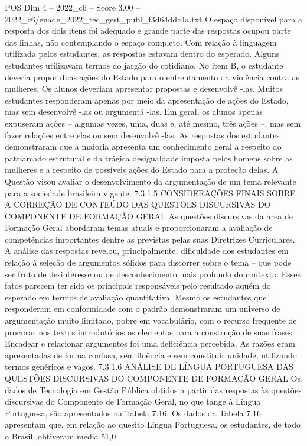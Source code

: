 \begin{textsample}{POS Dim 4 – 2022\_c6 – Score 3.00 – 2022\_c6/enade\_2022\_tec\_gest\_publ\_f3d64ddc4a.txt}
O espaço disponível para a resposta dos dois itens foi adequado e grande parte das respostas ocupou parte das linhas, não contemplando o espaço completo.
Com relação à linguagem utilizada pelos estudantes, as respostas estavam dentro do esperado.
Alguns estudantes utilizavam termos do jargão do cotidiano.
No item B, o estudante deveria propor duas ações do Estado para o enfrentamento da violência contra as mulheres.
Os alunos deveriam apresentar propostas e desenvolvê -las.
Muitos estudantes responderam apenas por meio da apresentação de ações do Estado, mas sem desenvolvê -las ou argumentá -las.
Em geral, os alunos apenas expuseram ações – algumas vezes, uma, duas e, até mesmo, três ações –, mas sem fazer relações entre elas ou sem desenvolvê -las.
As respostas dos estudantes demonstraram que a maioria apresenta um conhecimento geral a respeito do patriarcado estrutural e da trágica desigualdade imposta pelos homens sobre as mulheres e a respeito de possíveis ações do Estado para a proteção delas.
A Questão visou avaliar o desenvolvimento da argumentação de um tema relevante para a sociedade brasileira vigente. 7.3.1.5 CONSIDERAÇÕES FINAIS SOBRE A CORREÇÃO DE CONTEÚDO DAS QUESTÕES DISCURSIVAS DO COMPONENTE DE FORMAÇÃO GERAL As questões discursivas da área de Formação Geral abordaram temas atuais e proporcionaram a avaliação de competências importantes dentre as previstas pelas suas Diretrizes Curriculares.
A análise das respostas revelou, principalmente, dificuldade dos estudantes em relação à seleção de argumentos sólidos para discorrer sobre o tema – que pode ser fruto de desinteresse ou de desconhecimento mais profundo do contexto.
Esses fatos parecem ter sido os principais responsáveis pelo resultado aquém do esperado em termos de avaliação quantitativa.
Mesmo os estudantes que responderam em conformidade com o padrão demonstraram um universo de argumentação muito limitado, pobre em vocabulário, com o recurso frequente de procurar nos textos introdutórios os elementos para a construção de suas frases.
Encadear e relacionar argumentos foi uma deficiência percebida.
As razões eram apresentadas de forma confusa, sem fluência e sem constituir unidade, utilizando termos genéricos e vagos. 7.3.1.6 ANÁLISE DE LÍNGUA PORTUGUESA DAS QUESTÕES DISCURSIVAS DO COMPONENTE DE FORMAÇÃO GERAL Os dados de Tecnologia em Gestão Pública obtidos a partir das respostas às questões discursivas do Componente de Formação Geral, no que tange à Língua Portuguesa, são apresentados na Tabela 7.16.
Os dados da Tabela 7.16 apresentam que, em relação ao quesito Língua Portuguesa, os estudantes, de todo o Brasil, obtiveram média 51,0.

\end{textsample}
